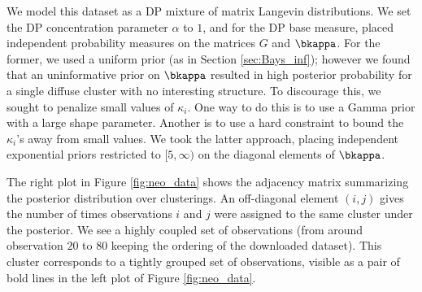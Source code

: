 We model this dataset as a DP mixture of matrix Langevin distributions. We set the DP concentration parameter $\alpha$
to $1$, and
for the DP base measure, %
placed independent probability measures on the matrices $G$ and $\bkappa$. %
For the former, we used a uniform prior (as in Section \ref{sec:Bays_inf}); %
however we found that an uninformative prior on $\bkappa$ resulted in high posterior probability for a single diffuse cluster
with no interesting structure.
To discourage this, we sought to penalize small values of $\kappa_i$. One way to do this is to
use a Gamma prior %
with a large shape parameter. Another is to use a hard constraint to bound the
$\kappa_i$'s away from small values. We took the latter approach, placing independent exponential priors restricted to $[5,\infty)$ on the
diagonal elements of $\bkappa$.

The right plot in Figure \ref{fig:neo_data} shows %
the adjacency matrix summarizing
the posterior distribution over clusterings. An off-diagonal element $(i,j)$ gives the number of times observations $i$ and $j$ were assigned to the
same cluster under the posterior. %
We see a highly coupled set of observations (from around observation $20$ to $80$ keeping the ordering of the downloaded dataset). This cluster
corresponds to a tightly grouped set of observations, visible as a pair of bold lines in the left plot of Figure \ref{fig:neo_data}.


